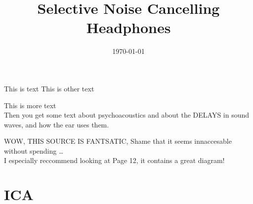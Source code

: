 \documentclass{ecsproject}
\title{Selective Noise Cancelling Headphones}
\date{\today}
\begin{document}
\maketitle

This is text \cite{EMHeadsets}
This is other text \cite{EMNoiseCancel}

This is more \cite{ICAAlg&Apps} text\\
Then you get some text about psychoacoustics \cite{MusCogCompSou} and about the DELAYS in sound waves, and how the ear uses them.

WOW, THIS SOURCE\cite{AdvancedDSPing} IS FANTSATIC, Shame that it seems innaccesable without spending \ldots \\
I especially reccommend looking at Page 12, it contains a great diagram!




\appendix
\chapter{ICA}

\end{document}
